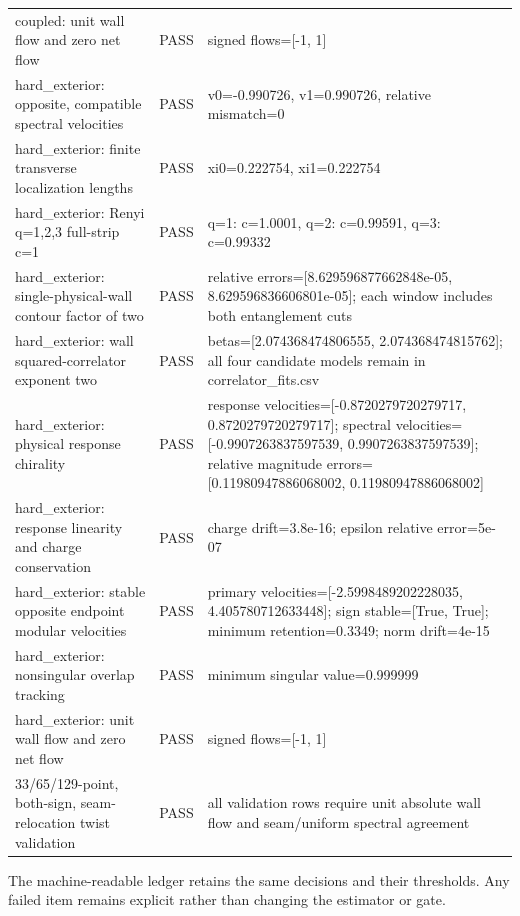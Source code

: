 \documentclass[aps,prb,onecolumn,nofootinbib,superscriptaddress]{revtex4-2}
\begin{document}
\begin{longtable}{p{}p{}p{}}
coupled: unit wall flow and zero net flow & PASS & signed flows=[-1, 1] \\
hard\_exterior: opposite, compatible spectral velocities & PASS & v0=-0.990726, v1=0.990726, relative mismatch=0 \\
hard\_exterior: finite transverse localization lengths & PASS & xi0=0.222754, xi1=0.222754 \\
hard\_exterior: Renyi q=1,2,3 full-strip c=1 & PASS & q=1: c=1.0001, q=2: c=0.99591, q=3: c=0.99332 \\
hard\_exterior: single-physical-wall contour factor of two & PASS & relative errors=[8.629596877662848e-05, 8.629596836606801e-05]; each window includes both entanglement cuts \\
hard\_exterior: wall squared-correlator exponent two & PASS & betas=[2.074368474806555, 2.074368474815762]; all four candidate models remain in correlator\_fits.csv \\
hard\_exterior: physical response chirality & PASS & response velocities=[-0.8720279720279717, 0.8720279720279717]; spectral velocities=[-0.9907263837597539, 0.9907263837597539]; relative magnitude errors=[0.11980947886068002, 0.11980947886068002] \\
hard\_exterior: response linearity and charge conservation & PASS & charge drift=3.8e-16; epsilon relative error=5e-07 \\
hard\_exterior: stable opposite endpoint modular velocities & PASS & primary velocities=[-2.5998489202228035, 4.405780712633448]; sign stable=[True, True]; minimum retention=0.3349; norm drift=4e-15 \\
hard\_exterior: nonsingular overlap tracking & PASS & minimum singular value=0.999999 \\
hard\_exterior: unit wall flow and zero net flow & PASS & signed flows=[-1, 1] \\
33/65/129-point, both-sign, seam-relocation twist validation & PASS & all validation rows require unit absolute wall flow and seam/uniform spectral agreement \\
\bottomrule
\end{longtable}
The machine-readable ledger retains the same decisions and their thresholds.  Any failed
item remains explicit rather than changing the estimator or gate.
\end{document}
